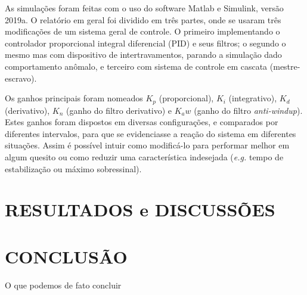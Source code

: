 \documentclass[a4paper,12pt]{article}
\begin{document}
As simulações foram feitas com o uso do software Matlab e Simulink, versão 2019a. O relatório em geral foi dividido em três partes, onde se usaram três modificações de um sistema geral de controle. O primeiro implementando o controlador proporcional integral diferencial (PID) e seus filtros; o segundo o mesmo mas com dispositivo de intertravamentos, parando a simulação dado comportamento anômalo, e terceiro com sistema de controle em cascata (mestre-escravo).

Os ganhos principais foram nomeados $K_p$ (proporcional), $K_i$ (integrativo), $K_d$ (derivativo), $K_n$ (ganho do filtro derivativo) e $K_aw$ (ganho do filtro \emph{anti-windup}). Estes ganhos foram dispostos em diversas configurações, e comparados por diferentes intervalos, para que se evidenciasse a reação do sistema em diferentes situações. Assim é possível intuir como modificá-lo para performar melhor em algum quesito ou como reduzir uma característica indesejada (\emph{e.g.} tempo de estabilização ou máximo sobressinal).
%
\newpage
%
%
%
\thispagestyle{main}
%
\section{RESULTADOS e DISCUSSÕES}%

%
%
%
%

\thispagestyle{main}

\section{CONCLUSÃO}\hspace{4ex}
O que podemos de fato concluir

\newpage




{}


\appendix


\end{document}
